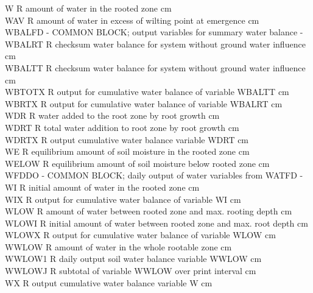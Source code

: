 \documentclass[11pt]{article}
\begin{document}
\begin{tabbing}
W\> \> R\> amount of water in the rooted zone\> \> \> \> \> \> \> cm\\
WAV\> \> R\> amount of water in excess of wilting point at emergence \> \> \> \> \> \> \> cm\\
WBALFD\> \> -\> COMMON BLOCK; output variables for summary water balance\> \> \> \> \> \> \> -\\
WBALRT\> \> R\> checksum water balance for system without ground water influence\> \> \> \> \> \> \> cm\\
WBALTT\> \> R\> checksum water balance for system without ground water influence\> \> \> \> \> \> \> cm\\
WBTOTX\> \> R\> output for cumulative water balance of variable WBALTT\> \> \> \> \> \> \> cm\\
WBRTX\> \> R\> output for cumulative water balance of variable WBALRT\> \> \> \> \> \> \> cm\\
WDR\> \> R\> water added to the root zone by root growth\> \> \> \> \> \> \> cm\\
WDRT\> \> R\> total water addition to root zone by root growth\> \> \> \> \> \> \> cm\\
WDRTX\> \> R\> output cumulative water balance variable WDRT\> \> \> \> \> \> \> cm\\
WE\> \> R\> equilibrium amount of soil moisture in the rooted zone\> \> \> \> \> \> \> cm\\
WELOW\> \> R\> equilibrium amount of soil moisture below rooted zone\> \> \> \> \> \> \> cm\\
WFDDO\> \> -\> COMMON BLOCK; daily output of water variables from WATFD\> \> \> \> \> \> \> -\\
WI\> \> R\> initial amount of water in the rooted zone\> \> \> \> \> \> \> cm\\
WIX\> \> R\> output for cumulative water balance of variable WI\> \> \> \> \> \> \> cm\\
WLOW\> \> R\> amount of water between rooted zone and max. rooting depth\> \> \> \> \> \> \> cm\\
WLOWI\> \> R\> initial amount of water between rooted zone and max. root depth\> \> \> \> \> \> \> cm\\
WLOWX\> \> R\> output for cumulative water balance of variable WLOW\> \> \> \> \> \> \> cm\\
WWLOW\> \> R\> amount of water in the whole rootable zone\> \> \> \> \> \> \> cm\\
WWLOW1\> \> R\> daily output soil water balance variable WWLOW\> \> \> \> \> \> \> cm\\
WWLOWJ\> \> R\> subtotal of variable WWLOW over print interval\> \> \> \> \> \> \> cm\\
WX\> \> R\> output cumulative water balance variable W\> \> \> \> \> \> \> cm
\end{tabbing}
\end{document}
